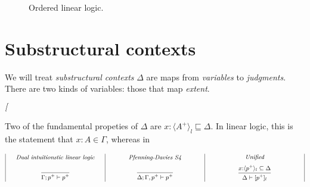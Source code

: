 \begin{figure}
\caption{Ordered linear logic.}
\end{figure}


\section{Substructural contexts}

We will treat {\it substructural contexts} $\Delta$ are maps from {\it
  variables} to {\it judgments}. There are two kinds of variables: 
those that map {\it extent}.

${\mbox{\it [}}$


Two of the fundamental propeties of $\Delta$ are 
$x{:}\langle A^+ \rangle_l \sqsubseteq \Delta$. In linear logic, this
is the statement that $x{:}A \in \Gamma$, whereas in 

\[\small
\begin{array}{|c|c|c|c|}
%
\begin{array}{c}
\makebox[1.8in]{\it Dual intuitionstic linear logic}\medskip
\\
\infer
{\Gamma; p^+ \vdash p^+ \mathstrut}
{\mathstrut}
\end{array}
%
&
%
\begin{array}{c}
\makebox[1.8in]{\it Pfenning-Davies S4}\medskip
\\
\infer
{\Delta; \Gamma, p^+ \mathstrut \vdash p^+}
{\mathstrut}
\end{array}
%
&
%
\begin{array}{c}
\makebox[1.8in]{\it Unified}\medskip
\\
\infer
{\Delta \vdash [ p^+ ]_l \mathstrut}
{x{:}\langle p^+ \rangle_l \subseteq \Delta \mathstrut}
\end{array}
%
\end{array}
\]

